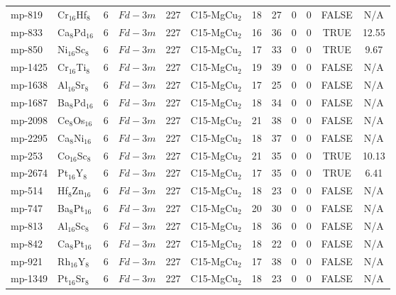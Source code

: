 {\begin{longtable}{llcccccccccc}
    mp-819 & Cr$_{16}$Hf$_{8}$ & 6     & $Fd-3m$ & 227   & C15-MgCu$_{2}$ & 18    & 27    & 0     & 0     & FALSE & N/A \\
    mp-833 & Ca$_{8}$Pd$_{16}$ & 6     & $Fd-3m$ & 227   & C15-MgCu$_{2}$ & 16    & 36    & 0     & 0     & TRUE  & 12.55  \\
    mp-850 & Ni$_{16}$Sc$_{8}$ & 6     & $Fd-3m$ & 227   & C15-MgCu$_{2}$ & 17    & 33    & 0     & 0     & TRUE  & 9.67  \\
    mp-1425 & Cr$_{16}$Ti$_{8}$ & 6     & $Fd-3m$ & 227   & C15-MgCu$_{2}$ & 19    & 39    & 0     & 0     & FALSE & N/A \\
    mp-1638 & Al$_{16}$Sr$_{8}$ & 6     & $Fd-3m$ & 227   & C15-MgCu$_{2}$ & 17    & 25    & 0     & 0     & FALSE & N/A \\
    mp-1687 & Ba$_{8}$Pd$_{16}$ & 6     & $Fd-3m$ & 227   & C15-MgCu$_{2}$ & 18    & 34    & 0     & 0     & FALSE & N/A \\
    mp-2098 & Ce$_{8}$Os$_{16}$ & 6     & $Fd-3m$ & 227   & C15-MgCu$_{2}$ & 21    & 38    & 0     & 0     & FALSE & N/A \\
    mp-2295 & Ca$_{8}$Ni$_{16}$ & 6     & $Fd-3m$ & 227   & C15-MgCu$_{2}$ & 18    & 37    & 0     & 0     & FALSE & N/A \\
    mp-253 & Co$_{16}$Sc$_{8}$ & 6     & $Fd-3m$ & 227   & C15-MgCu$_{2}$ & 21    & 35    & 0     & 0     & TRUE  & 10.13  \\
    mp-2674 & Pt$_{16}$Y$_{8}$ & 6     & $Fd-3m$ & 227   & C15-MgCu$_{2}$ & 17    & 35    & 0     & 0     & TRUE  & 6.41  \\
    mp-514 & Hf$_{8}$Zn$_{16}$ & 6     & $Fd-3m$ & 227   & C15-MgCu$_{2}$ & 18    & 23    & 0     & 0     & FALSE & N/A \\
    mp-747 & Ba$_{8}$Pt$_{16}$ & 6     & $Fd-3m$ & 227   & C15-MgCu$_{2}$ & 20    & 30    & 0     & 0     & FALSE & N/A \\
    mp-813 & Al$_{16}$Sc$_{8}$ & 6     & $Fd-3m$ & 227   & C15-MgCu$_{2}$ & 18    & 36    & 0     & 0     & FALSE & N/A \\
    mp-842 & Ca$_{8}$Pt$_{16}$ & 6     & $Fd-3m$ & 227   & C15-MgCu$_{2}$ & 18    & 22    & 0     & 0     & FALSE & N/A \\
    mp-921 & Rh$_{16}$Y$_{8}$ & 6     & $Fd-3m$ & 227   & C15-MgCu$_{2}$ & 17    & 38    & 0     & 0     & FALSE & N/A \\
    mp-1349 & Pt$_{16}$Sr$_{8}$ & 6     & $Fd-3m$ & 227   & C15-MgCu$_{2}$ & 18    & 23    & 0     & 0     & FALSE & N/A \\

\end{longtable}}
